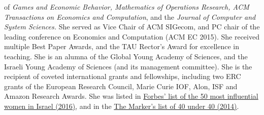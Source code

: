 \documentclass{toc}
\theoremstyle{plain}
\begin{document}
\begin{tocaboutauthors}
\begin{tocabout}[feldman]
of  %
%
\emph{Games and Economic Behavior, Mathematics of Operations Research, ACM Transactions on Economics and Computation}, and
the  %
\emph{Journal of Computer and System Sciences.} She served as Vice Chair of ACM SIGecom, and PC chair of the leading conference on Economics and Computation (ACM EC 2015).  She received multiple Best Paper Awards, and the
%
TAU  %
Rector's Award for excellence in teaching. She is an alumna of the Global Young Academy of Sciences, and the Israeli Young Academy of Sciences (and its management committee). She is the recipient of coveted international grants and fellowships, including two ERC grants of the European Research Council, Marie Curie IOF, Alon, ISF and Amazon Research %
Awards.   %
She was listed in \href{https://forbes.co.il/\%D7\%94\%D7\%A0\%D7\%A9\%D7\%99\%D7\%9D-\%D7\%94\%D7\%9E\%D7\%A9\%D7\%A4\%D7\%99\%D7\%A2\%D7\%95\%D7\%AA-2016/}{Forbes' list of the 50 most influential women in Israel (2016)}, and in the \href{https://www.themarker.com/st/c/prod/tm/2014/magazin/11/40promises/flip.html}{The Marker's list
of %
40 under 40 (2014)}.
\end{tocabout}
\end{tocaboutauthors}
\end{document}
